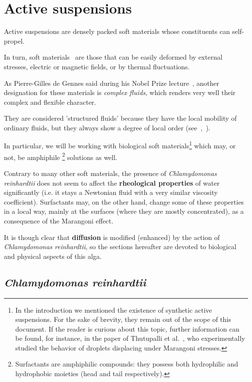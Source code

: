 \section{Active suspensions}
\label{active_suspensions}

Active suspensions are densely packed soft materials whose constituents can self-propel.

In turn, soft materials~\cite{Soft_materials} are those that can be easily deformed by external stresses, electric or magnetic fields, or by thermal fluctuations. 

As Pierre-Gilles de Gennes said during his Nobel Prize lecture~\cite{PGG}, another designation for these materials is \textit{complex fluids}, which renders very well their complex and flexible character.

They are considered 'structured fluids' because they have the local mobility of ordinary fluids, but they always show a degree of local order (see~\cite{soft_matter},~\cite{Hamley}).

In particular, we will be working with biological soft materials\footnote{In the introduction we mentioned the existence of synthetic active suspensions. For the sake of brevity, they remain out of the scope of this document. If the reader is curious about this topic, further information can be found, for instance, in the paper of Thutupalli et al.~\cite{Thutupalli}, who experimentally studied the behavior of droplets displacing under Marangoni stresses.} which may, or not, be amphiphile \footnote{Surfactants are amphiphilic compounds: they possess both hydrophilic and hydrophobic moieties (head and tail respectively).} solutions as well.

Contrary to many other soft materials, the presence of \textit{Chlamydomonas reinhardtii} does not seem to affect the \textbf{rheological properties} of water significantly (i.e. it stays a Newtonian fluid with a very similar viscosity coefficient). Surfactants may, on the other hand, change some of these properties in a local way, mainly at the surfaces (where they are mostly concentrated), as a consequence of the Marangoni effect.

It is though clear that \textbf{diffusion} is modified (enhanced) by the action of \textit{Chlamydomonas reinhardtii}, so the sections hereafter are devoted to biological and physical aspects of this alga.

\subsection{\textit{Chlamydomonas reinhardtii}}
\label{chlamy}

